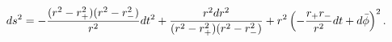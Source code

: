 \begin{equation} \label{rbtz}
ds^2 = - {(r^2- r_+^2)(r^2-r_-^2) \over r^2} dt^2 + {r^2 dr^2 \over
  (r^2 - r_+^2)(r^2 - r_-^2)} + r^2 \left( -{r_+ r_- \over r^2} dt +
  d\bar \phi \right)^2.
\end{equation}

